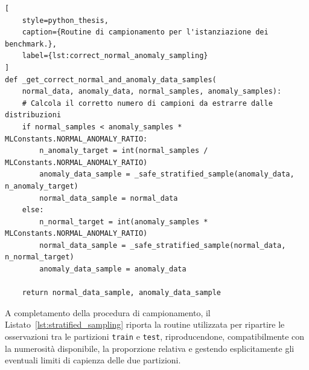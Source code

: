 \newpage

\begin{lstlisting}[
    style=python_thesis,
    caption={Routine di campionamento per l'istanziazione dei benchmark.},
    label={lst:correct_normal_anomaly_sampling}
]
def _get_correct_normal_and_anomaly_data_samples(
    normal_data, anomaly_data, normal_samples, anomaly_samples):
    # Calcola il corretto numero di campioni da estrarre dalle distribuzioni
    if normal_samples < anomaly_samples * MLConstants.NORMAL_ANOMALY_RATIO:
        n_anomaly_target = int(normal_samples / MLConstants.NORMAL_ANOMALY_RATIO)
        anomaly_data_sample = _safe_stratified_sample(anomaly_data, n_anomaly_target)
        normal_data_sample = normal_data
    else:
        n_normal_target = int(anomaly_samples * MLConstants.NORMAL_ANOMALY_RATIO)
        normal_data_sample = _safe_stratified_sample(normal_data, n_normal_target)
        anomaly_data_sample = anomaly_data

    return normal_data_sample, anomaly_data_sample
\end{lstlisting}

A completamento della procedura di campionamento, il Listato~\ref{lst:stratified_sampling} riporta la routine utilizzata per ripartire le osservazioni tra le partizioni \texttt{train} e \texttt{test}, riproducendone, compatibilmente con la numerosità disponibile, la proporzione relativa e gestendo esplicitamente gli eventuali limiti di capienza delle due partizioni.

